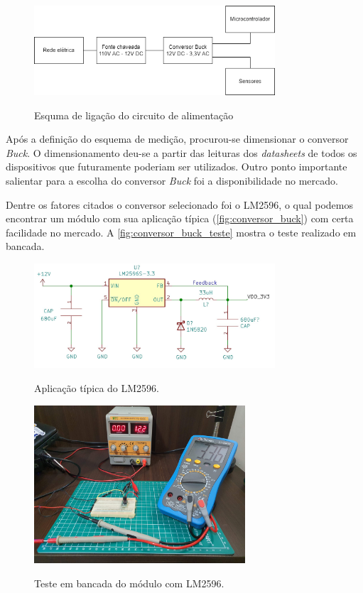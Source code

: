 \begin{figure}[H]
	\centering
	\caption{Esquma de ligação do circuito de alimentação}
	\includegraphics[width=0.8\textwidth]{figuras/alimentacao.png}
	\label{fig:alimentacao_esquema}
\end{figure}

Após a definição do esquema de medição, procurou-se dimensionar o conversor \textit{Buck}. O dimensionamento deu-se a partir das leituras dos \textit{datasheets} de todos os dispositivos que futuramente poderiam ser utilizados. Outro ponto importante salientar para a escolha do conversor \textit{Buck} foi a disponibilidade no mercado.

Dentre os fatores citados o conversor selecionado foi o LM2596, o qual podemos encontrar um módulo com sua aplicação típica (\autoref{fig:conversor_buck}) com certa facilidade no mercado. A \autoref{fig:conversor_buck_teste} mostra o teste realizado em bancada.

\begin{figure}[H]
	\centering
	\caption{Aplicação típica do LM2596.}
	\includegraphics[width=0.8\textwidth]{figuras/conversor_buck.jpg}
	\label{fig:conversor_buck}
\end{figure}

\begin{figure}[H]
	\centering
	\caption{Teste em bancada do módulo com LM2596.}
	\includegraphics[width=0.7\textwidth]{figuras/conversor_buck_teste.jpg}
	\label{fig:conversor_buck_teste}
\end{figure}

